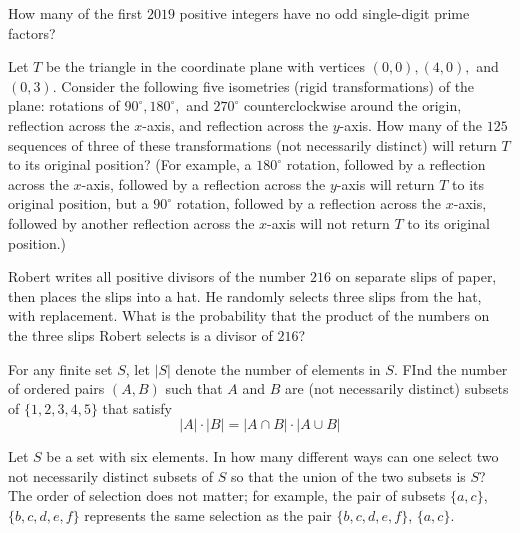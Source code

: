 \documentclass[mast]{lucky}
\begin{document}
\begin{prob}{2}
How many of the first $2019$ positive integers have no odd single-digit prime factors?
\end{prob}
    
     \begin{prob}[AMC 10A 2020/23]{3}
Let $T$ be the triangle in the coordinate plane with vertices $(0,0), (4,0),$ and $(0,3).$ Consider the following five isometries (rigid transformations) of the plane: rotations of $90^{\circ}, 180^{\circ},$ and $270^{\circ}$ counterclockwise around the origin, reflection across the $x$-axis, and reflection across the $y$-axis. How many of the $125$ sequences of three of these transformations (not necessarily distinct) will return $T$ to its original position? (For example, a $180^{\circ}$ rotation, followed by a reflection across the $x$-axis, followed by a reflection across the $y$-axis will return $T$ to its original position, but a $90^{\circ}$ rotation, followed by a reflection across the $x$-axis, followed by another reflection across the $x$-axis will not return $T$ to its original position.)
\end{prob}
    
    \begin{prob}{3}
Robert writes all positive divisors of the number $216$ on separate slips of paper, then places the slips into a hat. He randomly selects three slips from the hat, with replacement. What is the probability that the product of the numbers on the three slips Robert selects is a divisor of $216$?
\end{prob}

    \begin{prob}[AIME II 2021/6]{4}
For any finite set $S$, let $|S|$ denote the number of elements in $S$. FInd the number of ordered pairs $(A,B)$ such that $A$ and $B$ are (not necessarily distinct) subsets of $\{1,2,3,4,5\}$ that satisfy
$$|A| \cdot |B| = |A \cap B| \cdot |A \cup B|$$
\end{prob}
    
    \begin{prob}[AIME 1993/8]{4}
Let $S$ be a set with six elements. In how many different ways can one select two not necessarily distinct subsets of $S$ so that the union of the two subsets is $S$? The order of selection does not matter; for example, the pair of subsets $\{a, c\}$, $\{b, c, d, e, f\}$ represents the same selection as the pair $\{b, c, d, e, f\}$, $\{a, c\}$.
\end{prob}
    
\end{document}
